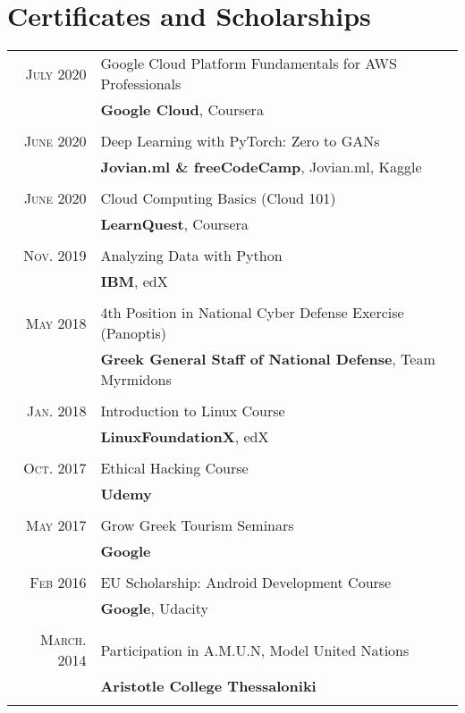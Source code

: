 \documentclass[a4paper,10pt]{article}
\begin{document}
\section{Certificates and Scholarships}
\begin{tabular}{rl}
    \textsc{July} 2020 & Google Cloud Platform Fundamentals for AWS Professionals \\& \textbf{Google Cloud}, Coursera \\ \\ 
    \textsc{June} 2020 & Deep Learning with PyTorch: Zero to GANs \\& \textbf{Jovian.ml \& freeCodeCamp}, Jovian.ml, Kaggle \\ \\
    \textsc{June} 2020 & Cloud Computing Basics (Cloud 101) \\& \textbf{LearnQuest}, Coursera \\ \\
    \textsc{Nov.} 2019 & Analyzing Data with Python \\& \textbf{IBM}, edX \\ \\
    \textsc{May} 2018 & 4th Position in National Cyber Defense Exercise (Panoptis)  \\& \textbf{Greek General Staff of National Defense}, Team Myrmidons \\ \\
    \textsc{Jan.} 2018 & Introduction to Linux Course\\& \textbf{LinuxFoundationX}, edX \\ \\
    \textsc{Oct.} 2017 & Ethical Hacking Course \\& \textbf{Udemy} \\ \\
    \textsc{May} 2017 & Grow Greek Tourism Seminars \\& \textbf{Google} \\ \\ 
    \textsc{Feb} 2016 & EU Scholarship: Android Development Course \\& \textbf{Google}, Udacity \\ \\
    \textsc{March.} 2014 & Participation in A.M.U.N, Model United Nations \\& \textbf{Aristotle College Thessaloniki} \\ \\ 

\end{tabular} 
\end{document}
